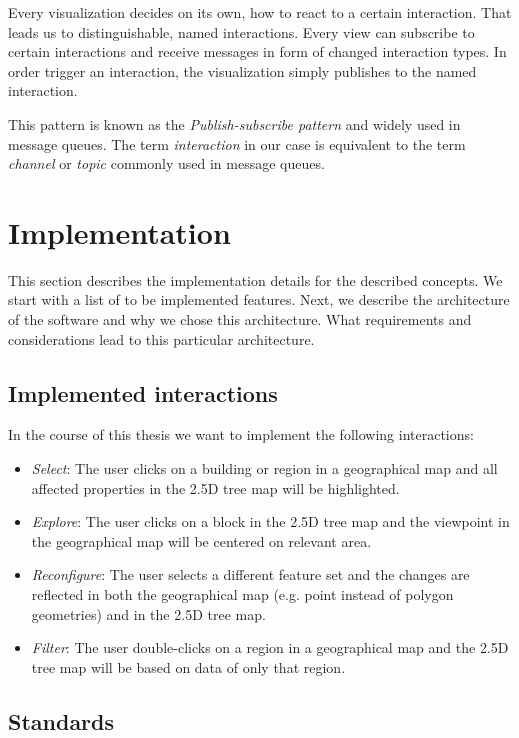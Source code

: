 \documentclass{article}
\newcommand{\tmap}{\textsc{2.5D} tree map}
\begin{document}
Every visualization decides on its own, how to react to a certain interaction.
That leads us to distinguishable, named interactions.
Every view can subscribe to certain interactions and receive messages in form of changed interaction types.
In order trigger an interaction, the visualization simply publishes to the named interaction.

This pattern is known as the \emph{Publish-subscribe pattern} and widely used in message queues.
The term \emph{interaction} in our case is equivalent to the term \emph{channel} or \emph{topic} commonly used in message queues.


\clearpage
\section{Implementation}\label{sec:implementation}

This section describes the implementation details for the described concepts.
We start with a list of to be implemented features.
Next, we describe the architecture of the software and why we chose this architecture.
What requirements and considerations lead to this particular architecture.


\subsection{Implemented interactions}

In the course of this thesis we want to implement the following interactions:
\begin{itemize}
  \item
    \emph{Select}: The user clicks on a building or region in a geographical map and all affected properties in the \tmap{} will be highlighted.
  \item
    \emph{Explore}: The user clicks on a block in the \tmap{} and the viewpoint in the geographical map will be centered on relevant area.
  \item
    \emph{Reconfigure}: The user selects a different feature set and the changes are reflected in both the geographical map (e.g. point instead of polygon geometries) and in the \tmap{}.
  \item
    \emph{Filter}: The user double-clicks on a region in a geographical map and the \tmap{} will be based on data of only that region.
\end{itemize}

\subsection{Standards}
\end{document}
